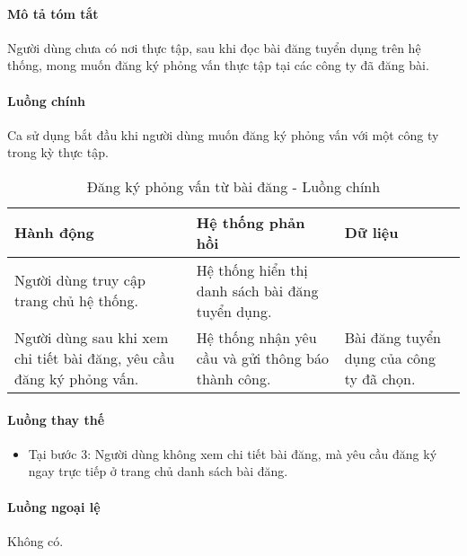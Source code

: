 \documentclass[./../main.tex]{subfiles}
\begin{document}
\paragraph*{Mô tả tóm tắt}

Người dùng chưa có nơi thực tập, sau khi đọc bài đăng tuyển dụng trên hệ
thống, mong muốn đăng ký phỏng vấn thực tập tại các công ty đã đăng bài.

\paragraph*{Luồng chính} Ca sử dụng bắt đầu khi người dùng muốn đăng ký phỏng vấn với một công ty trong kỳ thực tập.

\begin{table}[H]
  \caption{Đăng ký phỏng vấn từ bài đăng - Luồng chính}
  \label{tab:apply_post}
  \begin{tabularx}{\textwidth}{|X|X|X|}
  \hline
  \textbf{Hành động}                                                   & \textbf{Hệ thống phản hồi}                         & \textbf{Dữ liệu}                         \\ \hline
  Người dùng truy cập trang chủ hệ thống.                              & Hệ thống hiển thị danh sách bài đăng tuyển dụng.   &                                          \\ \hline
  Người dùng sau khi xem chi tiết bài đăng, yêu cầu đăng ký phỏng vấn. & Hệ thống nhận yêu cầu và gửi thông báo thành công. & Bài đăng tuyển dụng của công ty đã chọn. \\ \hline
  \end{tabularx}
\end{table}

\paragraph*{Luồng thay thế}

\begin{itemize}
\item
  
  Tại bước 3: Người dùng không xem chi tiết bài đăng, mà yêu cầu đăng ký
  ngay trực tiếp ở trang chủ danh sách bài đăng.
  
\end{itemize}

\paragraph*{Luồng ngoại lệ} Không có.
\end{document}
